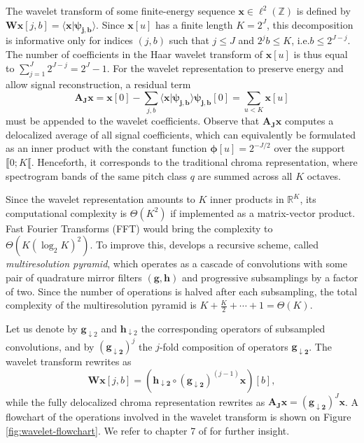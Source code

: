 \documentclass{article}
\makeatletter
\newcommand*{\ie}{i.e.\@\xspace}
\makeatother
\begin{document}
The wavelet transform of some finite-energy sequence
$\boldsymbol{x} \in \ell^2(\mathbb{Z})$ is defined by
$\mathbf{W} \boldsymbol{x}[j, b]
= \langle \boldsymbol{x} \vert \boldsymbol{\psi_{j,b}} \rangle$.
Since $\boldsymbol{x}[u]$ has a finite length $K = 2^J$,
this decomposition is informative only for indices $(j, b)$
such that $j \leq J$ and $2^j b \leq K$, \ie $b\leq2^{J-j}$.
The number of coefficients in the Haar wavelet transform of $\boldsymbol{x}[u]$ is thus equal to
$\sum_{j =1}^{J} 2^{J-j} = 2^J - 1$. For the wavelet representation to
preserve energy and allow signal reconstruction, a residual term
\begin{equation}
\boldsymbol{\mathbf{A}_J} \boldsymbol{x}
= \boldsymbol{x}[0] -
\sum_{j,b}
\langle \boldsymbol{x} \vert \boldsymbol{\psi_{j,b}} \rangle \boldsymbol{\psi_{j,b}}[0]
= \sum_{u<K} \boldsymbol{x}[u]
\label{eq:lowpass-term}
\end{equation}
must be appended to the wavelet coefficients.
Observe that $\boldsymbol{\mathbf{A}_J}  \boldsymbol{x}$
computes a delocalized average of all signal coefficients,
which can equivalently be formulated as an inner product with the constant
function $\boldsymbol{\phi}[u] = 2^{-J/2}$ over the support $\llbracket 0 ; K \llbracket$.
Henceforth, it corresponds to the traditional chroma representation, where spectrogram bands
of the same pitch class $q$ are summed across all $K$ octaves.

Since the wavelet representation amounts to $K$ inner products in $\mathbb{R}^K$,
its computational complexity is $\Theta(K^2)$ if implemented as a matrix-vector product.
Fast Fourier Transforms (FFT) would bring the complexity to
$\Theta{(K (\log_2 K)^2)}$.
To improve this, \cite{mallat1989theory} develops a recursive scheme, called
\emph{multiresolution pyramid}, which operates as a cascade
of convolutions with some pair of quadrature mirror filters
$(\boldsymbol{g}, \boldsymbol{h})$ and progressive subsamplings by a factor of two.
Since the number of operations is halved after each subsampling, the total
complexity of the multiresolution pyramid is $K + \frac{K}{2} + \cdots + 1 = \Theta(K)$.

Let us denote by $\boldsymbol{g}_{\downarrow 2}$ and
$\boldsymbol{h}_{\downarrow 2}$ the corresponding operators of subsampled
convolutions, and by $(\boldsymbol{g_{\downarrow 2}})^j$ the $j$-fold composition
of operators $\boldsymbol{g_{\downarrow 2}}$.
The wavelet transform rewrites as
\begin{equation}
\mathbf{W}\boldsymbol{x}[j,b] =
\left(
\boldsymbol{h_{\downarrow 2}} \circ
(\boldsymbol{g_{\downarrow 2}})^{(j-1)} \boldsymbol{x}
\right)[b],
\end{equation}
while the fully delocalized chroma representation rewrites as
$\boldsymbol{\mathbf{A}_J} \boldsymbol{x} =
(\boldsymbol{g_{\downarrow 2}})^J \boldsymbol{x}$.
A flowchart of the operations involved in the wavelet transform is shown on
Figure \ref{fig:wavelet-flowchart}.
We refer to chapter 7 of \cite{mallat2008wavelet}
for further insight.
\end{document}
